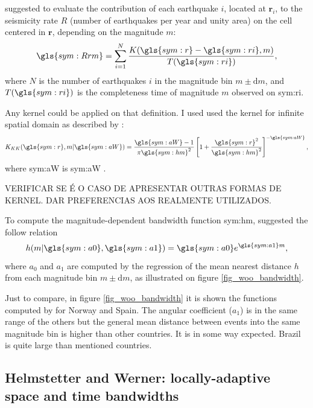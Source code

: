 \documentclass[draft, grl]{agutex}
\begin{document}
\begin{article}
\citet{woo_1996} suggested to evaluate the contribution of each earthquake $i$, located at $\boldsymbol{r}_i$, to the seismicity rate $R$ (number of earthquakes per year and unity area) on the cell centered in $\boldsymbol{r}$, depending on the magnitude $m$:
\begin{equation}
	\ensuremath{
		\gls{sym:Rrm} = \sum_{i=1}^{N} \frac{ K(\gls{sym:r} - \gls{sym:ri}, m)}
											{T({\gls{sym:ri})}},
	}
	\label{eq:Rrm}
\end{equation}
where $N$ is the number of earthquakes $i$ in the magnitude bin $m \pm \mathrm{d}m$,
and $T(\gls{sym:ri})$ is the completeness time of magnitude $m$ observed on \gls{sym:ri}.


Any kernel could be applied on that definition. I used used the \citet{kagan_knopoff_1980} kernel for infinite spatial domain as described by \citet{woo_1996}:
\begin{equation}
	\ensuremath{
		K_{KK}(\gls{sym:r}, m \arrowvert \gls{sym:aW}) =  \frac{  \gls{sym:aW}  -1}{\pi\gls{sym:hm}^2}
							\left[ 1 + \frac{\gls{sym:r}^2}{\gls{sym:hm}^2} \right]^{-\gls{sym:aW}},
	}
	\label{eq:k_kj}
\end{equation}
where \gls{sym:aW} is \glsdesc{sym:aW} \citep{verejones_1992}.


VERIFICAR SE É O CASO DE APRESENTAR OUTRAS FORMAS DE KERNEL. DAR PREFERENCIAS AOS REALMENTE UTILIZADOS.


To compute the magnitude-dependent bandwidth function \gls{sym:hm}, \citet{woo_1996} suggested the follow relation
\begin{equation}
	\ensuremath{
		h(m\arrowvert \gls{sym:a0}, \gls{sym:a1}) = \gls{sym:a0}e^{\gls{sym:a1}m},
	}
	\label{eq:hm}
\end{equation}
where $a_0$ and $a_1$ are computed by the regression of the mean nearest distance $h$ from each magnitude bin $m \pm \mathrm{d}m$, as illustrated on figure \ref{fig_woo_bandwidth}.

Just to compare, in figure \ref{fig_woo_bandwidth} it is shown the functions computed by \citet{beauval_2003} for Norway and Spain. The angular coefficient ($a_1$) is in the same range of the others but the general mean distance between events into the same magnitude bin is higher than other countries. It is in some way expected. Brazil is quite large than mentioned countries.



\subsection{Helmstetter and Werner: locally-adaptive space and time bandwidths}



\end{article}
\end{document}

